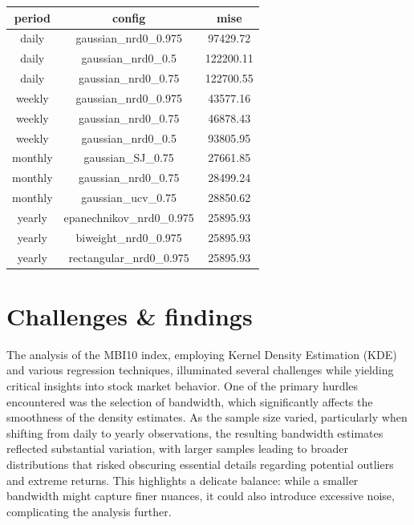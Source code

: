 \documentclass[]{article}
\begin{document}
	\begin{table}[H]
		\centering
		\begin{tabular}{ccc}
			\hline
			period  & config                    & mise             \\
			\hline
			daily   & gaussian\_nrd0\_0.975     & 97429.72  \\
			daily   & gaussian\_nrd0\_0.5       & 122200.11 \\
			daily   & gaussian\_nrd0\_0.75      & 122700.55 \\
			\hline
			weekly  & gaussian\_nrd0\_0.975     & 43577.16  \\
			weekly  & gaussian\_nrd0\_0.75      & 46878.43  \\
			weekly  & gaussian\_nrd0\_0.5       & 93805.95  \\
			\hline
			monthly & gaussian\_SJ\_0.75        & 27661.85  \\
			monthly & gaussian\_nrd0\_0.75      & 28499.24  \\
			monthly & gaussian\_ucv\_0.75       & 28850.62  \\
			\hline			
			yearly  & epanechnikov\_nrd0\_0.975 & 25895.93  \\
			yearly  & biweight\_nrd0\_0.975     & 25895.93  \\
			yearly  & rectangular\_nrd0\_0.975  & 25895.93  \\
			\hline
		\end{tabular}
	\end{table}
	
	\newpage
	
	\section{Challenges \& findings}
	The analysis of the MBI10 index, employing Kernel Density Estimation (KDE) and various regression techniques, illuminated several challenges while yielding critical insights into stock market behavior. One of the primary hurdles encountered was the selection of bandwidth, which significantly affects the smoothness of the density estimates. As the sample size varied, particularly when shifting from daily to yearly observations, the resulting bandwidth estimates reflected substantial variation, with larger samples leading to broader distributions that risked obscuring essential details regarding potential outliers and extreme returns. This highlights a delicate balance: while a smaller bandwidth might capture finer nuances, it could also introduce excessive noise, complicating the analysis further.\\
	
\end{document}
